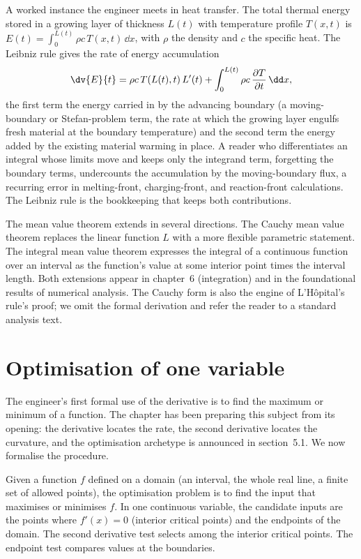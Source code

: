 A worked instance the engineer meets in heat transfer. The total thermal
energy stored in a growing layer of thickness $L(t)$ with temperature
profile $T(x, t)$ is $E(t) = \int_{0}^{L(t)} \rho c\,T(x, t)\,\dd x$,
with $\rho$ the density and $c$ the specific heat. The Leibniz rule gives
the rate of energy accumulation
\[
\dv{E}{t} = \rho c\,T(L(t), t)\,L'(t) +
\int_{0}^{L(t)} \rho c\,\frac{\partial T}{\partial t}\,\dd x,
\]
the first term the energy carried in by the advancing boundary (a
moving-boundary or Stefan-problem term, the rate at which the growing
layer engulfs fresh material at the boundary temperature) and the second
term the energy added by the existing material warming in place. A
reader who differentiates an integral whose limits move and keeps only
the integrand term, forgetting the boundary terms, undercounts the
accumulation by the moving-boundary flux, a recurring error in
melting-front, charging-front, and reaction-front calculations. The
Leibniz rule is the bookkeeping that keeps both contributions.

\begin{mastery}
The mean value theorem extends in several directions. The Cauchy
mean value theorem replaces the linear function $L$ with a more
flexible parametric statement. The integral mean value theorem
expresses the integral of a continuous function over an interval
as the function's value at some interior point times the interval
length. Both extensions appear in chapter~6 (integration) and in
the foundational results of numerical analysis. The Cauchy form
is also the engine of L'H\^opital's rule's proof; we omit the
formal derivation and refer the reader to a standard analysis
text.
\end{mastery}

\section{Optimisation of one variable}

The engineer's first formal use of the derivative is to find the
maximum or minimum of a function. The chapter has been preparing
this subject from its opening: the derivative locates the rate, the
second derivative locates the curvature, and the optimisation
archetype is announced in section~5.1. We now formalise the
procedure.

\begin{archetype}
Given a function $f$ defined on a domain (an interval, the whole
real line, a finite set of allowed points), the optimisation
problem is to find the input that maximises or minimises $f$. In
one continuous variable, the candidate inputs are the points where
$f'(x) = 0$ (interior critical points) and the endpoints of the
domain. The second derivative test selects among the interior
critical points. The endpoint test compares values at the
boundaries.
\end{archetype}

